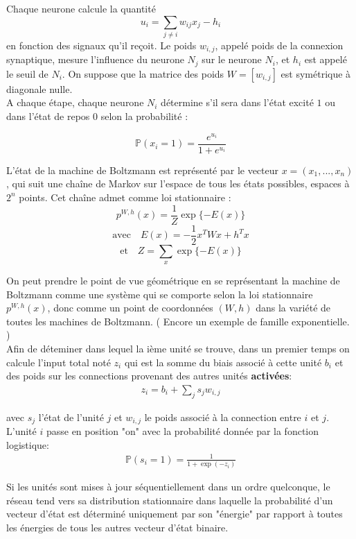 \documentclass{article}
\theoremstyle{definition}
\begin{document}
\noindent Chaque neurone calcule la quantité
\[u_i=\sum_{j \neq i} w_{ij}x_j-h_i\]
en fonction des signaux qu'il reçoit. Le poids $w_{i,j}$, appelé poids de la connexion synaptique, mesure l'influence du neurone $N_j$ sur le neurone $N_i$, et $h_i$ est appelé le seuil de $N_i$. On suppose que la matrice des poids $W= [w_{i,j}]$ est symétrique à diagonale nulle.\\
A chaque étape, chaque neurone $N_i$ détermine s'il sera dans l'état excité $1$ ou dans l'état de repos $0$ selon la probabilité :

\[\mathbb P(x_i=1)=\frac{e^{u_i}}{1+e^{u_i}}\]

L'état de la machine de Boltzmann est représenté par le vecteur $x=(x_1,...,x_n)$, qui suit une chaîne de Markov sur l'espace de tous les états possibles, espaces à $2^n$ points. Cet chaîne admet comme loi stationnaire :
\[p^{W,h}(x)=\frac{1}{Z}\exp\{-E(x)\}\]
\[\text{avec} \quad E(x)=-\frac{1}{2}x^TWx +h^Tx\]
\[\text{et} \quad Z=\sum_x \exp\{-E(x)\}\]

On peut prendre le point de vue géométrique en se représentant la machine de Boltzmann comme une système qui se comporte selon la loi stationnaire $p^{W,h}(x)$, donc comme un point de coordonnées $(W,h)$ dans la variété de toutes les machines de Boltzmann. ( Encore un exemple de famille exponentielle. )\\

\noindent Afin de déteminer dans lequel la ième unité se trouve, dans un premier temps on calcule l'input total noté $z_i$ qui est la somme du biais associé à cette unité $b_i$ et des poids sur les connections provenant des autres unités \textbf{activées}:
\begin{align*}
z_i=b_i+\sum_{j}s_j w_{i,j}
\end{align*}

\noindent avec $s_j$ l'état de l'unité $j$ et $w_{i,j}$ le poids associé à la connection entre $i$ et $j$.\\

\noindent L'unité $i$ passe en position "on" avec la probabilité donnée par la fonction logistique:
\begin{align*}
\mathbb{P}(s_i=1)=\frac{1}{1+\exp(-z_i)}
\end{align*}

\noindent Si les unités sont mises à jour séquentiellement dans un ordre quelconque, le réseau tend vers sa distribution stationnaire dans laquelle la probabilité d'un vecteur d'état est déterminé uniquement par son "énergie" par rapport à toutes les énergies de tous les autres vecteur d'état binaire.\\
\end{document}
